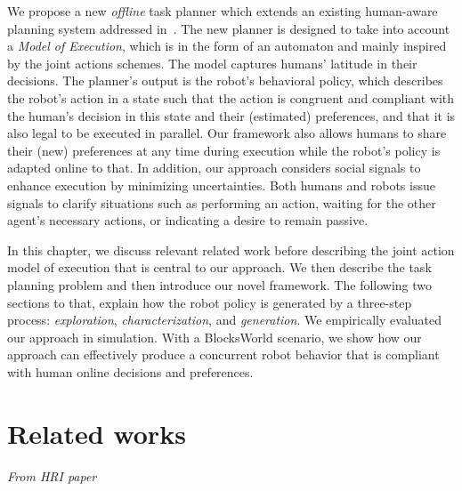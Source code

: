 We propose a new \textit{offline} task planner which extends an existing human-aware planning system addressed in~\cite{buisan_hatpehda_icra}. 
The new planner is designed to take into account a \textit{Model of Execution}, which is in the form of an automaton and mainly inspired by the joint actions schemes. 
The model captures humans' latitude in their decisions. 
The planner's output is the robot's behavioral policy, which describes the robot's action in a state such that the action is congruent and compliant with the human's decision in this state and their (estimated) preferences, and that it is also legal to be executed in parallel. 
Our framework also allows humans to share their (new) preferences at any time during execution while the robot's policy is adapted online to that. 
In addition, our approach considers social signals to enhance execution by minimizing uncertainties. Both humans and robots issue signals to clarify situations such as performing an action, waiting for the other agent's necessary actions, or indicating a desire to remain passive.

In this chapter, we discuss relevant related work before describing the joint action model of execution that is central to our approach. 
We then describe the task planning problem and then introduce our novel framework. 
The following two sections to that, explain how the robot policy is generated by a three-step process: \textit{exploration}, \textit{characterization}, and \textit{generation}. 
We empirically evaluated our approach in simulation. With a BlocksWorld scenario, we show how our approach can effectively produce a concurrent robot behavior that is compliant with human online decisions and preferences.  

\section{Related works}

\textit{From HRI paper}

